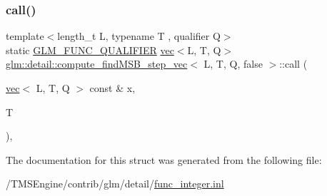 \subsubsection{\texorpdfstring{call()}{call()}}
{\footnotesize\ttfamily template$<$length\+\_\+t L, typename T , qualifier Q$>$ \\
static \hyperlink{setup_8hpp_a33fdea6f91c5f834105f7415e2a64407}{G\+L\+M\+\_\+\+F\+U\+N\+C\+\_\+\+Q\+U\+A\+L\+I\+F\+I\+ER} \hyperlink{structglm_1_1vec}{vec}$<$L, T, Q$>$ \hyperlink{structglm_1_1detail_1_1compute__find_m_s_b__step__vec}{glm\+::detail\+::compute\+\_\+find\+M\+S\+B\+\_\+step\+\_\+vec}$<$ L, T, Q, false $>$\+::call (\begin{DoxyParamCaption}\item[{\hyperlink{structglm_1_1vec}{vec}$<$ L, T, Q $>$ const \&}]{x,  }\item[{T}]{ }\end{DoxyParamCaption})\hspace{0.3cm}{\ttfamily [inline]}, {\ttfamily [static]}}



The documentation for this struct was generated from the following file\+:\begin{DoxyCompactItemize}
\item 
/\+T\+M\+S\+Engine/contrib/glm/detail/\hyperlink{func__integer_8inl}{func\+\_\+integer.\+inl}\end{DoxyCompactItemize}
